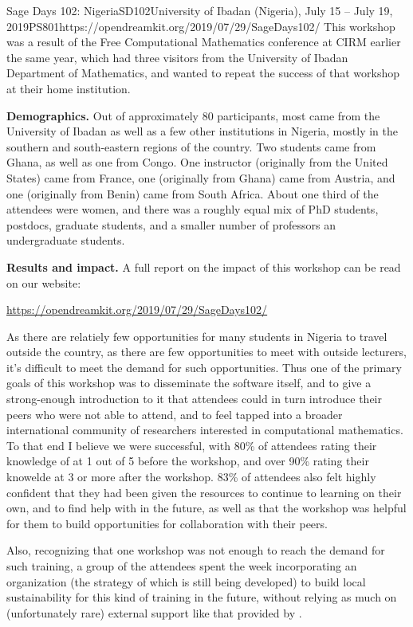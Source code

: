 \begin{event}{Sage Days 102: Nigeria}{SD102}{University of Ibadan (Nigeria), July 15 -- July 19, 2019}{PS}{80}{1}{https://opendreamkit.org/2019/07/29/SageDays102/}
This workshop was a result of the Free Computational Mathematics conference at
CIRM earlier the same year, which had three visitors from the University
of Ibadan Department of Mathematics, and wanted to repeat the success of
that workshop at their home institution.


\textbf{Demographics.} Out of approximately 80 participants, most came from the
University of Ibadan as well as a few other institutions in Nigeria,
mostly in the southern and south-eastern regions of the country.  Two
students came from Ghana, as well as one from Congo.  One instructor
(originally from the United States) came from France, one (originally
from Ghana) came from Austria, and one (originally from Benin) came
from South Africa.  About one third of the attendees were women, and
there was a roughly equal mix of PhD students, postdocs, graduate
students, and a smaller number of professors an undergraduate students.

\textbf{Results and impact.} A full report on the impact of this
workshop can be read on our website:
\centerline{\url{https://opendreamkit.org/2019/07/29/SageDays102/}}

As there are relatiely few opportunities for many students in Nigeria to travel
outside the country, as there are few opportunities to meet with
outside lecturers, it's difficult to meet the demand for such
opportunities. Thus one of the primary goals of this workshop was to
disseminate the software itself, and to give a strong-enough
introduction to it that attendees could in turn introduce their peers
who were not able to attend, and to feel tapped into a broader
international community of researchers interested in computational
mathematics. To that end I believe we were successful, with 80\% of
attendees rating their knowledge of \Sage at 1 out of 5 before the
workshop, and over 90\% rating their knowelde at 3 or more after the
workshop.  83\% of attendees also felt highly confident that they had
been given the resources to continue to learning on their own, and to
find help with \Sage in the future, as well as that the workshop was
helpful for them to build opportunities for collaboration with their
peers.

Also, recognizing that one workshop was not enough to reach the demand for such
training, a group of the attendees spent the week incorporating an
organization (the strategy of which is still being developed) to build
local sustainability for this kind of training in the future, without
relying as much on (unfortunately rare) external support like that provided
by \ODK.


\end{event}

